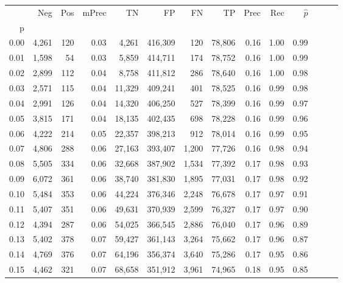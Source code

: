 \begin{tabular}{rrrrrrrrrrrrrr}
\toprule
{} &     Neg &    Pos & mPrec &       TN &       FP &      FN &      TP &  Prec &   Rec & $\hat{p}$ \\
p    &         &        &       &          &          &         &         &       &       &           \\
\midrule
0.00 &   4,261 &    120 &  0.03 &    4,261 &  416,309 &     120 &  78,806 &  0.16 &  1.00 &      0.99 \\
0.01 &   1,598 &     54 &  0.03 &    5,859 &  414,711 &     174 &  78,752 &  0.16 &  1.00 &      0.99 \\
0.02 &   2,899 &    112 &  0.04 &    8,758 &  411,812 &     286 &  78,640 &  0.16 &  1.00 &      0.98 \\
0.03 &   2,571 &    115 &  0.04 &   11,329 &  409,241 &     401 &  78,525 &  0.16 &  0.99 &      0.98 \\
0.04 &   2,991 &    126 &  0.04 &   14,320 &  406,250 &     527 &  78,399 &  0.16 &  0.99 &      0.97 \\
0.05 &   3,815 &    171 &  0.04 &   18,135 &  402,435 &     698 &  78,228 &  0.16 &  0.99 &      0.96 \\
0.06 &   4,222 &    214 &  0.05 &   22,357 &  398,213 &     912 &  78,014 &  0.16 &  0.99 &      0.95 \\
0.07 &   4,806 &    288 &  0.06 &   27,163 &  393,407 &   1,200 &  77,726 &  0.16 &  0.98 &      0.94 \\
0.08 &   5,505 &    334 &  0.06 &   32,668 &  387,902 &   1,534 &  77,392 &  0.17 &  0.98 &      0.93 \\
0.09 &   6,072 &    361 &  0.06 &   38,740 &  381,830 &   1,895 &  77,031 &  0.17 &  0.98 &      0.92 \\
0.10 &   5,484 &    353 &  0.06 &   44,224 &  376,346 &   2,248 &  76,678 &  0.17 &  0.97 &      0.91 \\
0.11 &   5,407 &    351 &  0.06 &   49,631 &  370,939 &   2,599 &  76,327 &  0.17 &  0.97 &      0.90 \\
0.12 &   4,394 &    287 &  0.06 &   54,025 &  366,545 &   2,886 &  76,040 &  0.17 &  0.96 &      0.89 \\
0.13 &   5,402 &    378 &  0.07 &   59,427 &  361,143 &   3,264 &  75,662 &  0.17 &  0.96 &      0.87 \\
0.14 &   4,769 &    376 &  0.07 &   64,196 &  356,374 &   3,640 &  75,286 &  0.17 &  0.95 &      0.86 \\
0.15 &   4,462 &    321 &  0.07 &   68,658 &  351,912 &   3,961 &  74,965 &  0.18 &  0.95 &      0.85 \\

\end{tabular}
